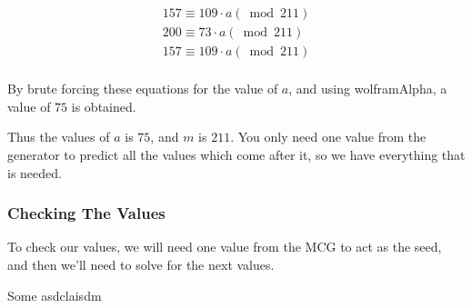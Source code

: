 \documentclass[12pft, english]{article}
\begin{document}
\begin{multicols}{2}
  \begin{gather*}
      157 \equiv 109 \cdot a (\bmod 211) \\
      200 \equiv 73 \cdot a (\bmod 211)  \\
      157 \equiv 109 \cdot a (\bmod 211) \\
    \end{gather*}

    By brute forcing these equations for the value of \(a\), and using wolframAlpha, a value of \(75\) is obtained.

    Thus the values of \(a\) is \(75\), and \(m\) is \(211\). You only need one value from the generator to predict all the values which come after it, so we have everything that is needed.

    \subsubsection{Checking The Values}
    To check our values, we will need one value from the MCG to act as the seed, and then we'll need to solve for the next values.

\end{multicols}

Some asdclaisdm \citep{example}

\citet{waterlooMCG}

\citet{whack}



\end{document}
